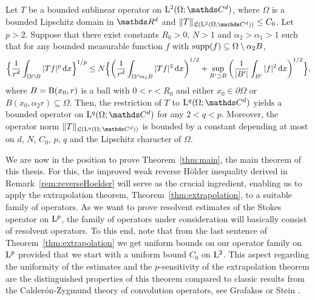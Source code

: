 \begin{thm}
  \label{thm:extrapolation}
  Let $T$ be a bounded sublinear operator on $\Ell^2(\Omega; \C^d)$, where $\Omega$ is a bounded Lipschitz domain in $\R^d$ and $\|T\|_{\Li(\Ell^2(\Omega; \C^d))} \leq C_0$.
  Let $p > 2$.
  Suppose that there exist constants $R_0 > 0$, $N > 1$ and $\alpha_2 > \alpha_1 > 1$ such that for any bounded measurable function $f$ with $\operatorname{supp}(f) \subseteq \Omega \setminus \alpha_2 B$,
  \begin{align*}
    \Big\{ \frac{1}{r^d} \int_{\Omega \cap B} |Tf|^p \, {\operatorname{d}\!{x}} \Big\}^{1/p}
    \leq N \Big\{ \bigg( \frac{1}{r^d} \int_{\Omega \cap \alpha_1 B} |T f|^2 \, {\operatorname{d}\!{x}} \bigg)^{1/2} + \sup_{B' \supset B} \bigg( \frac{1}{|B'|} \int_{B'} |f|^2 \, {\operatorname{d}\!{x}} \bigg)^{1/2} \Big\},
  \end{align*}
  where $B = \mathrm{B}(x_0, r)$ is a ball with $0 < r < R_0$ and either $x_0 \in \partial\Omega$ or $B(x_0, \alpha_2 r) \subseteq \Omega$.
  Then, the restriction of $T$ to $\Ell^q(\Omega;\C^d)$ yields a bounded operator on $\Ell^q(\Omega; \C^d)$ for any $2 < q < p$.
  Moreover, the operator norm $\|T\|_{\Li(\Ell^q(\Omega;\, \C^d))}$ is bounded by a constant depending at most on $d$, $N$, $C_0$, $p$, $q$ and the Lipschitz character of $\Omega$.
\end{thm}

We are now in the position to prove Theorem~\ref{thm:main}, the main theorem of this thesis. 
For this, the improved weak reverse H\"older inequality derived in Remark~\ref{rem:reverseHoelder} will serve as the crucial ingredient, enabling us to apply the extrapolation theorem, Theorem~\ref{thm:extrapolation}, to a suitable family of operators.
As we want to prove resolvent estimates of the Stokes operator on $\mathrm{L}^p$, the family of operators under consideration will basically consist of resolvent operators.
To this end, note that from the last sentence of Theorem~\ref{thm:extrapolation} we get uniform bounds on our operator family on $\mathrm{L}^p$ provided that we start with a uniform bound $C_0$ on $\mathrm{L}^2$.
This aspect regarding the uniformity of the estimates and the $p$-sensitivity of the extrapolation theorem are the distinguished properties of this theorem compared to classic results from the Calder\'on-Zygmund theory of convolution operators, see Grafakos \cite[Sec.\@~5.3]{grafakos2014classical} or Stein \cite[Ch.\@~2]{stein}.

